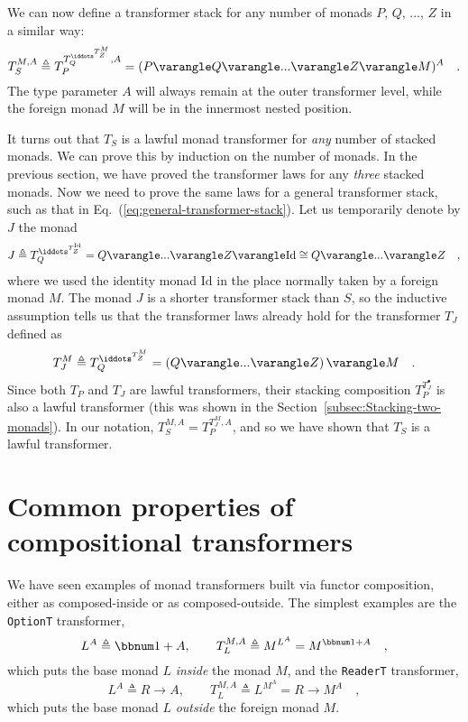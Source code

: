 We can now define a transformer stack for any number of monads $P$,
$Q$, ..., $Z$ in a similar way:
\begin{equation}
T_{S}^{M,A}\triangleq T_{P}^{T_{Q}^{\iddots^{T_{Z}^{M}}},A}=(P\varangle Q\varangle...\varangle Z\varangle M)^{A}\quad.\label{eq:general-transformer-stack}
\end{equation}
The type parameter $A$ will always remain at the outer transformer
level, while the foreign monad $M$ will be in the innermost nested
position.

It turns out that $T_{S}$ is a lawful monad transformer for \emph{any}
number of stacked monads. We can prove this by induction on the number
of monads. In the previous section, we have proved the transformer
laws for any \emph{three} stacked monads. Now we need to prove the
same laws for a general transformer stack, such as that in Eq.~(\ref{eq:general-transformer-stack}).
Let us temporarily denote by $J$ the monad 
\[
J\triangleq T_{Q}^{\iddots^{T_{Z}^{\text{Id}}}}=Q\varangle...\varangle Z\varangle\text{Id}\cong Q\varangle...\varangle Z\quad,
\]
where we used the identity monad $\text{Id}$ in the place normally
taken by a foreign monad $M$. The monad $J$ is a shorter transformer
stack than $S$, so the inductive assumption tells us that the transformer
laws already hold for the transformer $T_{J}$ defined as
\[
T_{J}^{M}\triangleq T_{Q}^{\iddots^{T_{Z}^{M}}}=\left(Q\varangle...\varangle Z\right)\varangle M\quad.
\]
Since both $T_{P}$ and $T_{J}$ are lawful transformers, their stacking
composition $T_{P}^{T_{J}^{\bullet}}$ is also a lawful transformer
(this was shown in the Section~\ref{subsec:Stacking-two-monads}).
In our notation, $T_{S}^{M,A}=T_{P}^{T_{J}^{M},A}$, and so we have
shown that $T_{S}$ is a lawful transformer.

\section{Common properties of compositional transformers \label{sec:Monad-transformers-that-use-composition}}

We have seen examples of monad transformers built via functor composition,
either as composed-inside or as composed-outside. The simplest examples
are the \lstinline!OptionT! transformer,
\[
L^{A}\triangleq\bbnum 1+A,\quad\quad T_{L}^{M,A}\triangleq M^{L^{A}}=M^{\bbnum 1+A}\quad,
\]
which puts the base monad $L$ \emph{inside} the monad $M$, and the
\lstinline!ReaderT! transformer, 
\[
L^{A}\triangleq R\rightarrow A,\quad\quad T_{L}^{M,A}\triangleq L^{M^{A}}=R\rightarrow M^{A}\quad,
\]
which puts the base monad $L$ \emph{outside} the foreign monad $M$. 

